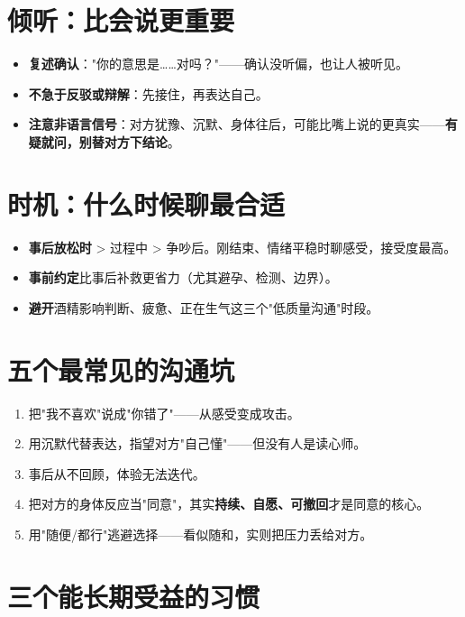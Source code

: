 \documentclass[12pt,UTF8,openany]{ctexbook}
\begin{document}
\section{倾听：比会说更重要}

\begin{itemize}[leftmargin=2em,itemsep=0.3em]
  \item \textbf{复述确认}："你的意思是……对吗？"——确认没听偏，也让人被听见。
  \item \textbf{不急于反驳或辩解}：先接住，再表达自己。
  \item \textbf{注意非语言信号}：对方犹豫、沉默、身体往后，可能比嘴上说的更真实——\textbf{有疑就问，别替对方下结论}。
\end{itemize}

\section{时机：什么时候聊最合适}

\begin{itemize}[leftmargin=2em,itemsep=0.3em]
  \item \textbf{事后放松时} > 过程中 > 争吵后。刚结束、情绪平稳时聊感受，接受度最高。
  \item \textbf{事前约定}比事后补救更省力（尤其避孕、检测、边界）。
  \item \textbf{避开}酒精影响判断、疲惫、正在生气这三个"低质量沟通"时段。
\end{itemize}

\section{五个最常见的沟通坑}

\begin{enumerate}[leftmargin=2em,itemsep=0.3em]
  \item 把"我不喜欢"说成"你错了"——从感受变成攻击。
  \item 用沉默代替表达，指望对方"自己懂"——但没有人是读心师。
  \item 事后从不回顾，体验无法迭代。
  \item 把对方的身体反应当"同意"，其实\textbf{持续、自愿、可撤回}才是同意的核心。
  \item 用"随便/都行"逃避选择——看似随和，实则把压力丢给对方。
\end{enumerate}

\section{三个能长期受益的习惯}
\end{document}
